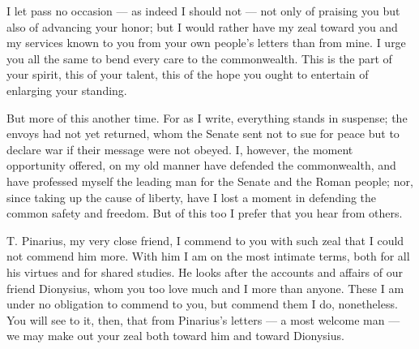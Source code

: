 

 I let pass no occasion --- as indeed I should not --- not only of praising you but also of advancing your honor; but I would rather have my zeal toward you and my services known to you from your own people's letters than from mine. I urge you all the same to bend every care to the commonwealth. This is the part of your spirit, this of your talent, this of the hope you ought to entertain of enlarging your standing.

 But more of this another time. For as I write, everything stands in suspense; the envoys had not yet returned, whom the Senate sent not to sue for peace but to declare war if their message were not obeyed. I, however, the moment opportunity offered, on my old manner have defended the commonwealth, and have professed myself the leading man for the Senate and the Roman people; nor, since taking up the cause of liberty, have I lost a moment in defending the common safety and freedom. But of this too I prefer that you hear from others.

 T. Pinarius, my very close friend, I commend to you with such zeal that I could not commend him more. With him I am on the most intimate terms, both for all his virtues and for shared studies. He looks after the accounts and affairs of our friend Dionysius, whom you too love much and I more than anyone. These I am under no obligation to commend to you, but commend them I do, nonetheless. You will see to it, then, that from Pinarius's letters --- a most welcome man --- we may make out your zeal both toward him and toward Dionysius.
